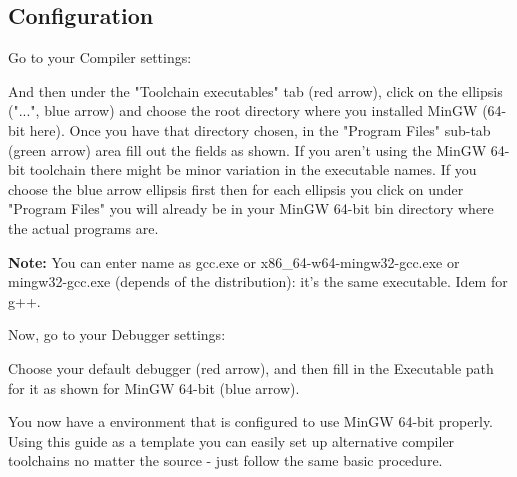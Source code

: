 \newpage
\subsection{\codeblocks Configuration}

Go to your Compiler settings:


And then under the "Toolchain executables" tab (red arrow), click on the ellipsis ("...", blue arrow) and choose the root directory where you installed MinGW (64-bit here). Once you have that directory chosen, in the "Program Files" sub-tab (green arrow) area fill out the fields as shown. If you aren't using the MinGW 64-bit toolchain there might be minor variation in the executable names. If you choose the blue arrow ellipsis first then for each ellipsis you click on under "Program Files" you will already be in your MinGW 64-bit bin directory where the actual programs are.


\textbf{Note:} You can enter name as gcc.exe or x86\_64-w64-mingw32-gcc.exe or mingw32-gcc.exe (depends of the distribution): it's the same executable. Idem for g++.



Now, go to your Debugger settings:


Choose your default debugger (red arrow), and then fill in the Executable path for it as shown for MinGW 64-bit (blue arrow).



You now have a \codeblocks environment that is configured to use MinGW 64-bit properly. Using this guide as a template you can easily set up alternative compiler toolchains no matter the source - just follow the same basic procedure.

